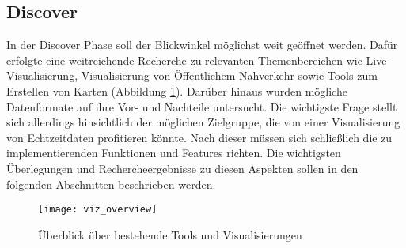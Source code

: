 \begin{newpage}
  \section{Discover}
  \label{sec:discover}
    In der Discover Phase soll der Blickwinkel möglichst weit geöffnet werden.
    Dafür erfolgte eine weitreichende Recherche zu relevanten Themenbereichen wie Live-Visualisierung, Visualisierung von Öffentlichem Nahverkehr sowie Tools zum Erstellen von Karten (Abbildung \ref{fig:viz_overview}). Darüber hinaus wurden mögliche Datenformate auf ihre Vor- und Nachteile untersucht. Die wichtigste Frage stellt sich allerdings hinsichtlich der möglichen Zielgruppe, die von einer Visualisierung von Echtzeitdaten profitieren könnte. Nach dieser müssen sich schließlich die zu implementierenden Funktionen und Features richten. Die wichtigsten Überlegungen und Rechercheergebnisse zu diesen Aspekten sollen in den folgenden Abschnitten beschrieben werden.

    \begin{figure}[htbp]
      \begin{center}
        \texttt{[image: viz\_overview]}
        \caption{Überblick über bestehende Tools und Visualisierungen}
        \label{fig:viz_overview}
      \end{center}
    \end{figure}

    
    
    

\end{newpage}